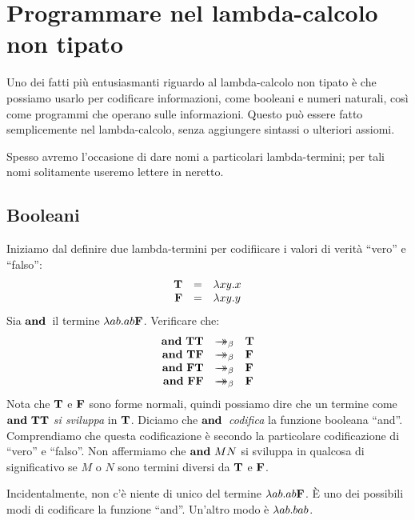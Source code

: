 \documentclass{article}
\begin{document}
\section{Programmare nel lambda-calcolo non tipato}

Uno dei fatti pi\`u entusiasmanti riguardo al lambda-calcolo non tipato \`e che
possiamo usarlo per codificare informazioni, come booleani e numeri
naturali, cos\`i come programmi che operano sulle informazioni. Questo pu\`o essere
fatto semplicemente nel lambda-calcolo, senza aggiungere sintassi o
ulteriori assiomi.

Spesso avremo l'occasione di dare nomi a particolari lambda-termini;
per tali nomi solitamente useremo lettere in neretto.

\subsection{Booleani}\label{ssec-booleans}

Iniziamo dal definire due lambda-termini per codifiicare i valori di verit\`a
``vero'' e ``falso'':
\[ \begin{array}{rcl}
  {\bf T} &=& \lambda xy.x \\
  {\bf F} &=& \lambda xy.y
\end{array}
\]
Sia $\mathop{\textbf{\bf and}\,}$ il termine $\lambda ab.ab{\bf F}$. Verificare che:
\[ \begin{array}{rcl}
  \andt \truet \truet &\redbs& \truet \\
  \andt \truet \falset &\redbs& \falset \\
  \andt \falset \truet &\redbs& \falset \\
  \andt \falset \falset &\redbs& \falset
\end{array}
\]
Nota che ${\bf T}$ e ${\bf F}$ sono forme normali, quindi possiamo
dire che un termine come $\mathop{\textbf{\bf and}\,} {\bf T} {\bf T}$ {\em si sviluppa} in
${\bf T}$. Diciamo che $\mathop{\textbf{\bf and}\,}$ {\em codifica} la funzione booleana
``and''. Comprendiamo che questa codificazione \`e secondo la
particolare codificazione di ``vero'' e ``falso''. Non affermiamo che
$\mathop{\textbf{\bf and}\,} MN$ si sviluppa in qualcosa di significativo se $M$ o $N$ sono 
termini diversi da ${\bf T}$ e ${\bf F}$.

Incidentalmente, non c'\`e niente di unico del termine $\lambda
ab.ab{\bf F}$. \`E uno dei possibili modi di codificare la funzione 
``and''. Un'altro modo \`e $\lambda ab.bab$.
\end{document}

